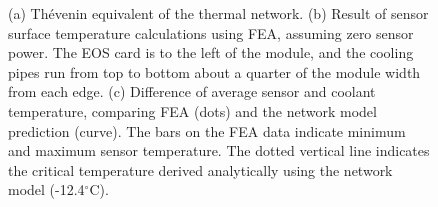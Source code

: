 \begin{figure}[ht]
\centering
{}\quad
{}\quad\quad
{}
\caption{(a) Th\'{e}venin equivalent of the thermal network. (b) Result of sensor surface temperature calculations using FEA, assuming zero sensor power. The EOS card is to the left of the module, and the cooling pipes run from top to bottom about a quarter of the module width from each edge. (c) Difference of average sensor and coolant temperature, comparing FEA (dots) and the network model prediction (curve). The bars on the FEA data indicate minimum and maximum sensor temperature. The dotted vertical line indicates the critical temperature derived analytically using the network model (-12.4$^\circ$C).}
\label{fig:verification}
\end{figure}
